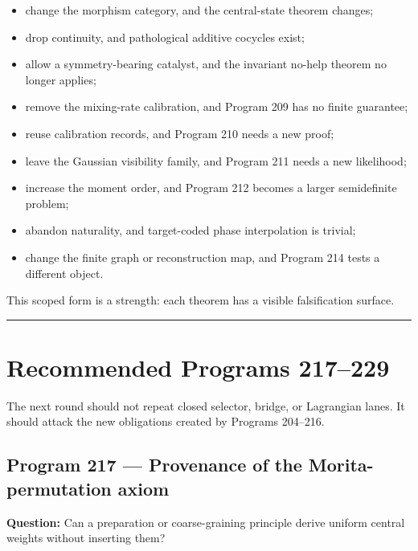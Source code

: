 \documentclass[11pt,a4paper,openany]{report}
\begin{document}
\begin{itemize}
\item 
change the morphism category, and the central-state theorem changes;

\item 
drop continuity, and pathological additive cocycles exist;

\item 
allow a symmetry-bearing catalyst, and the invariant no-help theorem no longer applies;

\item 
remove the mixing-rate calibration, and Program 209 has no finite guarantee;

\item 
reuse calibration records, and Program 210 needs a new proof;

\item 
leave the Gaussian visibility family, and Program 211 needs a new likelihood;

\item 
increase the moment order, and Program 212 becomes a larger semidefinite problem;

\item 
abandon naturality, and target-coded phase interpolation is trivial;

\item 
change the finite graph or reconstruction map, and Program 214 tests a different object.

\end{itemize}

This scoped form is a strength: each theorem has a visible falsification surface.

\par\medskip\hrule\medskip

\chapter{Recommended Programs 217--229}

The next round should not repeat closed selector, bridge, or Lagrangian lanes. It should attack the new obligations created by Programs 204--216.

\section{Program 217 --- Provenance of the Morita-permutation axiom}

\textbf{Question:} Can a preparation or coarse-graining principle derive uniform central weights without inserting them?
\end{document}
